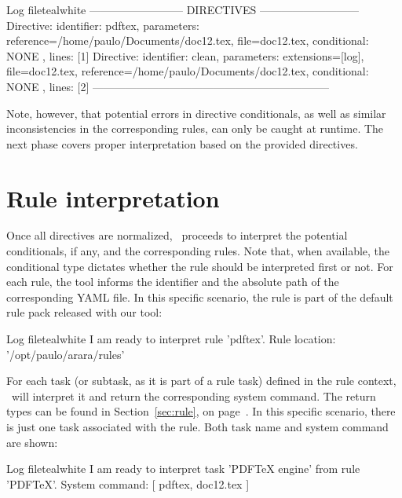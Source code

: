 \begin{codebox}{Log file}{teal}{\icnote}{white}
-------------------------- DIRECTIVES ---------------------------
Directive: { identifier: pdftex, parameters:
{reference=/home/paulo/Documents/doc12.tex,
file=doc12.tex}, conditional: { NONE }, lines: [1] }
Directive: { identifier: clean, parameters: {extensions=[log],
file=doc12.tex, reference=/home/paulo/Documents/doc12.tex},
conditional: { NONE }, lines: [2] }
-----------------------------------------------------------------
\end{codebox}

Note, however, that potential errors in directive conditionals, as well as similar inconsistencies in the corresponding rules, can only be caught at runtime. The next phase covers proper interpretation based on the provided directives.

\section{Rule interpretation}
\label{sec:ruleinterpretation}

Once all directives are normalized, \arara\ proceeds to interpret the potential conditionals, if any, and the corresponding rules. Note that, when available, the conditional type dictates whether the rule should be interpreted first or not. For each rule, the tool informs the identifier and the absolute path of the corresponding \gls{YAML} file. In this specific scenario, the rule is part of the default rule pack released with our tool:

\begin{codebox}{Log file}{teal}{\icnote}{white}
I am ready to interpret rule 'pdftex'.
Rule location: '/opt/paulo/arara/rules'
\end{codebox}

For each task (or subtask, as it is part of a rule task) defined in the rule context, \arara\ will interpret it and return the corresponding system command. The return types can be found in Section~\ref{sec:rule}, on page~\pageref{sec:rule}. In this specific scenario, there is just one task associated with the  rule. Both task name and system command are shown:

\begin{codebox}{Log file}{teal}{\icnote}{white}
I am ready to interpret task 'PDFTeX engine' from rule 'PDFTeX'.
System command: [ pdftex, doc12.tex ]
\end{codebox}

